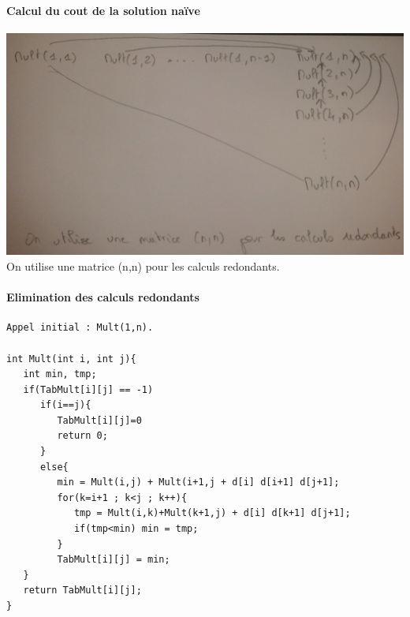 \paragraph{Calcul du cout de la solution naïve}
\includegraphics[width=15cm]{Photo0092}
On utilise une matrice (n,n) pour les calculs redondants.

\paragraph{Elimination des calculs redondants}
\begin{verbatim}
Appel initial : Mult(1,n).

int Mult(int i, int j){
   int min, tmp;
   if(TabMult[i][j] == -1)
      if(i==j){
         TabMult[i][j]=0
         return 0;
      }
      else{
         min = Mult(i,j) + Mult(i+1,j + d[i] d[i+1] d[j+1];
         for(k=i+1 ; k<j ; k++){
            tmp = Mult(i,k)+Mult(k+1,j) + d[i] d[k+1] d[j+1];
            if(tmp<min) min = tmp;
         }
         TabMult[i][j] = min;
   }
   return TabMult[i][j];
}
\end{verbatim}

